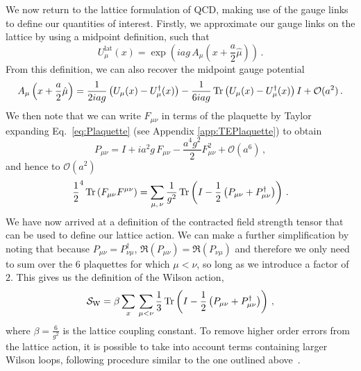 We now return to the lattice formulation of QCD, making use of the gauge links to define our quantities of interest. Firstly, we approximate our gauge links on the lattice by using a midpoint definition, such that
\begin{equation}
U_\mu^\text{lat}(x) = \exp\left(iag\, A_\mu\left(x+\frac{a}{2}\hat{\mu}\right)\right)\, .
\label{eq:GaugeLinkLat}
\end{equation}
From this definition, we can also recover the midpoint gauge potential~\cite{Leinweber:1998im,Alles:1996ka}
\begin{equation}
A_\mu\left(x+\frac{a}{2}\hat{\mu}\right) = \frac{1}{2iag}\left(U_\mu(x) - U_\mu^\dag(x)\right) - \frac{1}{6iag}\operatorname{Tr}\left(U_\mu(x) - U_\mu^\dag(x)\right)I + \mathcal{O}(a^2)\, .
\label{eq:GaugePotentialLat}
\end{equation}
We then note that we can write $F_{\mu\nu}$ in terms of the plaquette by Taylor expanding Eq.~\ref{eq:Plaquette} (see Appendix \ref{app:TEPlaquette}) to obtain~\cite{Gupta:1997nd}
%
\begin{equation}
P_{\mu\nu} = I+ia^2g\, F_{\mu\nu} - \frac{a^4 g^2}{2}F^2_{\mu\nu} +\mathcal{O}(a^6)\, ,
\label{eq:PlaquetteExpansion}
\end{equation} 
%
and hence to $\mathcal{O}(a^2)$
%
\begin{align}
\frac{1}{2}^4\operatorname{Tr}\left(F_{\mu\nu}F^{\mu\nu}\right) = \sum_{\mu,\,\nu}\frac{1}{g^2}\operatorname{Tr}\left(I-\frac{1}{2}\left(P_{\mu\nu}+P_{\mu\nu}^\dag\right)\right)\, .
\label{eq:FieldStrengthPlaquette}
\end{align}
%
We have now arrived at a definition of the contracted field strength tensor that can be used to define our lattice action. We can make a further simplification by noting that because $P_{\mu\nu}=P_{\nu\mu}^\dagger$, $\Re(P_{\mu\nu}) = \Re(P_{\nu\mu})$ and therefore we only need to sum over the 6 plaquettes for which $\mu<\nu$, so long as we introduce a factor of $2$. This gives us the definition of the Wilson action, 
%
\begin{equation}
\mathcal{S}_\text{W} = \beta\sum_x\,\sum_{\mu<\nu} \frac{1}{3}\operatorname{Tr}\left(I-\frac{1}{2}\left(P_{\mu\nu}+P_{\mu\nu}^\dag\right)\right)\, ,
\label{eq:WilsonAction}
\end{equation}
%
where $\beta = \frac{6}{g^2}$ is the lattice coupling constant. To remove higher order errors from the lattice action, it is possible to take into account terms containing larger Wilson loops, following procedure similar to the one outlined above~\cite{Alford:1995hw,Symanzik:1983dc,Symanzik:1983gh}.\\

